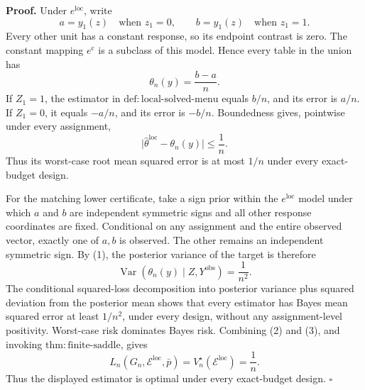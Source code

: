 \textbf{Proof.}
Under \(e^{\mathrm{loc}}\), write
\[
 a=y_1(z)\quad\text{when }z_1=0,
 \qquad
 b=y_1(z)\quad\text{when }z_1=1.
\]
Every other unit has a constant response, so its endpoint contrast is zero.  The constant mapping \(e^{\mathrm c}\) is a subclass of this model.  Hence every table in the union has
\[
 \theta_n(y)=\frac{b-a}{n}. \tag{1}
\]
If \(Z_1=1\), the estimator in \(\mathrm{def{:}local\text{-}solved\text{-}menu}\) equals \(b/n\), and its error is \(a/n\).  If \(Z_1=0\), it equals \(-a/n\), and its error is \(-b/n\).  Boundedness gives, pointwise under every assignment,
\[
 \bigl|\widehat\theta^{\mathrm{loc}}-\theta_n(y)\bigr|
 \le\frac1n. \tag{2}
\]
Thus its worst-case root mean squared error is at most \(1/n\) under every exact-budget design.

For the matching lower certificate, take a sign prior within the \(e^{\mathrm{loc}}\) model under which \(a\) and \(b\) are independent symmetric signs and all other response coordinates are fixed.  Conditional on any assignment and the entire observed vector, exactly one of \(a,b\) is observed.  The other remains an independent symmetric sign.  By (1), the posterior variance of the target is therefore
\[
 \operatorname{Var}(\theta_n(y)\mid Z,Y^{\mathrm{obs}})=\frac1{n^2}. \tag{3}
\]
The conditional squared-loss decomposition into posterior variance plus squared deviation from the posterior mean shows that every estimator has Bayes mean squared error at least \(1/n^2\), under every design, without any assignment-level positivity.  Worst-case risk dominates Bayes risk.  Combining (2) and (3), and invoking \(\mathrm{thm{:}finite\text{-}saddle}\), gives
\[
 L_n(G_n,\mathcal E^{\mathrm{loc}},\bar p)
 =V_n^\star(\mathcal E^{\mathrm{loc}})=\frac1n.
\]
Thus the displayed estimator is optimal under every exact-budget design. \(\square\)